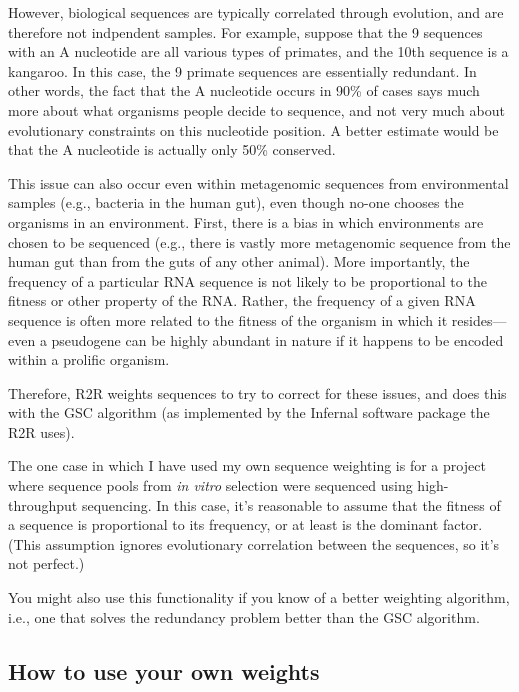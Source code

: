 \documentclass[letterpaper,12pt]{report}
\begin{document}
However, biological sequences are typically correlated through evolution, and are therefore not indpendent samples.  For example, suppose that the 9 sequences with an A nucleotide are all various types of primates, and the 10th sequence is a kangaroo.  In this case, the 9 primate sequences are essentially redundant.  In other words, the fact that the A nucleotide occurs in 90\% of cases says much more about what organisms people decide to sequence, and not very much about evolutionary constraints on this nucleotide position. A better estimate would be that the A nucleotide is actually only 50\% conserved.

This issue can also occur even within metagenomic sequences from environmental samples (e.g., bacteria in the human gut), even though no-one chooses the organisms in an environment.  First, there is a bias in which environments are chosen to be sequenced (e.g., there is vastly more metagenomic sequence from the human gut than from the guts of any other animal).  More importantly, the frequency of a particular RNA sequence is not likely to be proportional to the fitness or other property of the RNA.  Rather, the frequency of a given RNA sequence is often more related to the fitness of the organism in which it resides---even a pseudogene can be highly abundant in nature if it happens to be encoded within a prolific organism.

Therefore, R2R weights sequences to try to correct for these issues, and does this with the GSC algorithm\cite{GSC} (as implemented
by the Infernal\cite{InfernalUserGuide} software package the R2R uses).

The one case in which I have used my own sequence weighting is for a project where sequence pools from {\it in vitro} selection were sequenced using high-throughput sequencing.  In this case, it's reasonable to assume that the fitness of a sequence is proportional to its frequency, or at least is the dominant factor. (This assumption ignores evolutionary correlation between the sequences, so it's not perfect.)

You might also use this functionality if you know of a better weighting algorithm, i.e., one that solves the redundancy problem better than the GSC algorithm.

\subsection{How to use your own weights}
\end{document}
